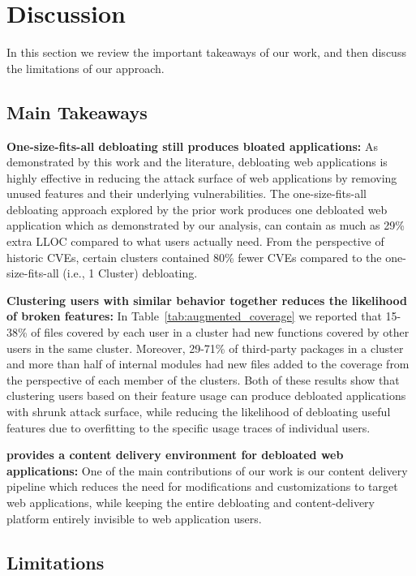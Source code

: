 \section{Discussion}

In this section we review the important takeaways of our work, and then discuss the limitations of our approach.

\subsection{Main Takeaways}

\noindent\textbf{One-size-fits-all debloating still produces bloated applications:} 
As demonstrated by this work and the literature, debloating web applications is highly effective in reducing the attack surface of web applications by removing unused features and their underlying vulnerabilities. 
The one-size-fits-all debloating approach explored by the prior work produces one debloated web application which as demonstrated by our analysis, can contain as much as 29\% extra LLOC compared to what users actually need. 
From the perspective of historic CVEs, certain clusters contained 80\% fewer CVEs compared to the one-size-fits-all (i.e., 1 Cluster) debloating. 

\noindent\textbf{Clustering users with similar behavior together reduces the likelihood of broken features:} 
In Table~\ref{tab:augmented_coverage} we reported that 15-38\% of files covered by each user in a cluster had new functions covered by other users in the same cluster. 
Moreover, 29-71\% of third-party packages in a cluster and more than half of internal modules had new files added to the coverage from the perspective of each member of the clusters. 
Both of these results show that clustering users based on their feature usage can produce debloated applications with shrunk attack surface, while reducing the likelihood of debloating useful features due to overfitting to the specific usage traces of individual users. 

\noindent\textbf{\sys{} provides a content delivery environment for debloated web applications:} 
One of the main contributions of our work is our content delivery pipeline which reduces the need for modifications and customizations to target web applications, while keeping the entire debloating and content-delivery platform entirely invisible to web application users.

\subsection{Limitations} 

